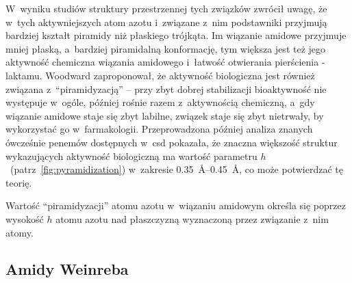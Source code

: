 W~wyniku studiów struktury przestrzennej tych związków zwrócił uwagę, że w~tych aktywniejszych
  atom azotu i~związane z~nim podstawniki przyjmują bardziej kształt piramidy niż płaskiego
  trójkąta.
Im wiązanie amidowe przyjmuje mniej płaską, a~bardziej piramidalną konformację, tym większa
  jest też jego aktywność chemiczna wiązania amidowego i~łatwość otwierania pierścienia
  \textbeta{}-laktamu.
Woodward zaproponował, że aktywność biologiczna jest również związana z~\enquote{piramidyzacją} \---
  przy zbyt dobrej stabilizacji bioaktywność nie występuje w~ogóle, później rośnie razem
  z~aktywnością chemiczną, a~gdy wiązanie amidowe staje się zbyt labilne, związek staje się
  zbyt nietrwały, by wykorzystać go w~farmakologii.
Przeprowadzona później analiza znanych ówcześnie penemów dostępnych w~\gls{csd} pokazała, że
  znaczna większość struktur wykazujących aktywność biologiczną ma wartość parametru 
  $h$~(patrz~\cref{fig:pyramidization}) w~zakresie
  \SIrange{0.35}{0.45}{\angstrom}, co może potwierdzać tę teorię.
\begin{marginfigure}[-25\baselineskip]
  
  \caption{
    Wartość \enquote{piramidyzacji} atomu azotu w~wiązaniu amidowym określa się poprzez wysokość $h$
      atomu azotu nad płaszczyzną wyznaczoną przez związanie z~nim atomy.
  }
  \label{fig:pyramidization}
\end{marginfigure}


\subsection{Amidy Weinreba}\label{literature:structure:weinreb}

